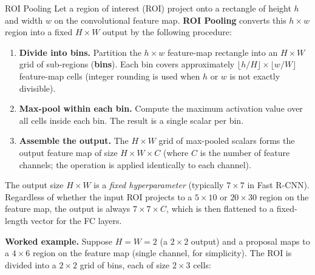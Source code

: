 \documentclass[11pt,a4paper]{article}
\begin{document}
\begin{defbox}{ROI Pooling}
Let a region of interest (ROI) project onto a rectangle of height $h$ and width $w$ on the
convolutional feature map.  \textbf{ROI Pooling} converts this $h \times w$ region into a fixed
$H \times W$ output by the following procedure:

\begin{enumerate}
  \item \textbf{Divide into bins.}  Partition the $h \times w$ feature-map rectangle into an
    $H \times W$ grid of sub-regions (\textbf{bins}).  Each bin covers approximately
    $\lfloor h/H \rfloor \times \lfloor w/W \rfloor$ feature-map cells (integer rounding is used
    when $h$ or $w$ is not exactly divisible).
  \item \textbf{Max-pool within each bin.}  Compute the maximum activation value over all cells
    inside each bin.  The result is a single scalar per bin.
  \item \textbf{Assemble the output.}  The $H \times W$ grid of max-pooled scalars forms the output
    feature map of size $H \times W \times C$ (where $C$ is the number of feature channels; the
    operation is applied identically to each channel).
\end{enumerate}

The output size $H \times W$ is a \emph{fixed hyperparameter} (typically $7 \times 7$ in Fast
R-CNN).  Regardless of whether the input ROI projects to a $5 \times 10$ or $20 \times 30$
region on the feature map, the output is always $7 \times 7 \times C$, which is then flattened
to a fixed-length vector for the FC layers.
\end{defbox}

\textbf{Worked example.}  Suppose $H = W = 2$ (a $2\times2$ output) and a proposal maps to a
$4\times6$ region on the feature map (single channel, for simplicity).
The ROI is divided into a $2\times2$ grid of bins, each of size $2\times3$ cells:
\end{document}

